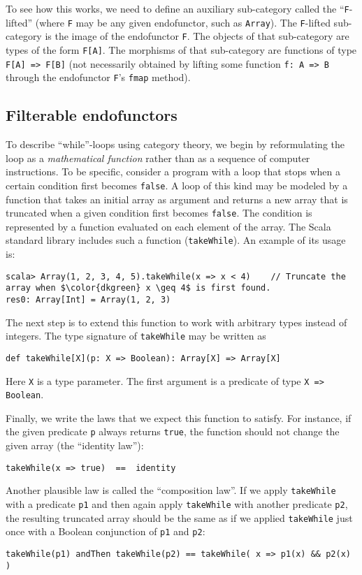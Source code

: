 To see how this works, we need to define an auxiliary sub-category
called the \textsf{``}\lstinline!F!-lifted\textsf{''} (where \lstinline!F! may be
any given endofunctor, such as \lstinline!Array!). The \lstinline!F!-lifted
sub-category is the image of the endofunctor \lstinline!F!. The objects
of that sub-category are types of the form \lstinline!F[A]!. The
morphisms of that sub-category are functions of type \lstinline!F[A] => F[B]!
(not necessarily obtained by lifting some function \lstinline!f: A => B!
through the endofunctor \lstinline!F!\textsf{'}s \lstinline!fmap! method). 

\subsection{Filterable endofunctors}

To describe \textsf{``}while\textsf{''}-loops using category theory, we begin by reformulating
the loop as a \emph{mathematical function} rather than as a sequence
of computer instructions. To be specific, consider a program with
a loop that stops when a certain condition first becomes \lstinline!false!.
A loop of this kind may be modeled by a function that takes an initial
array as argument and returns a new array that is truncated when a
given condition first becomes \lstinline!false!. The condition is
represented by a function evaluated on each element of the array.
The Scala standard library includes such a function (\lstinline!takeWhile!).
An example of its usage is:
\begin{lstlisting}[mathescape=true]
scala> Array(1, 2, 3, 4, 5).takeWhile(x => x < 4)    // Truncate the array when $\color{dkgreen} x \geq 4$ is first found.
res0: Array[Int] = Array(1, 2, 3) 
\end{lstlisting}
The next step is to extend this function to work with arbitrary types
instead of integers. The type signature of \lstinline!takeWhile!
may be written as
\begin{lstlisting}
def takeWhile[X](p: X => Boolean): Array[X] => Array[X]
\end{lstlisting}
Here \lstinline!X! is a type parameter. The first argument is a predicate
of type \lstinline!X => Boolean!.

Finally, we write the laws that we expect this function to satisfy.
For instance, if the given predicate \lstinline!p! always returns
\lstinline!true!, the function should not change the given array
(the \textsf{``}identity law\textsf{''}):
\begin{lstlisting}
takeWhile(x => true)  ==  identity
\end{lstlisting}
Another plausible law is called the \textsf{``}composition law\textsf{''}. If we apply
\lstinline!takeWhile! with a predicate \lstinline!p1! and then again
apply \lstinline!takeWhile! with another predicate \lstinline!p2!,
the resulting truncated array should be the same as if we applied
\lstinline!takeWhile! just once with a Boolean conjunction of \lstinline!p1!
and \lstinline!p2!: 
\begin{lstlisting}
takeWhile(p1) andThen takeWhile(p2) == takeWhile( x => p1(x) && p2(x) )
\end{lstlisting}

